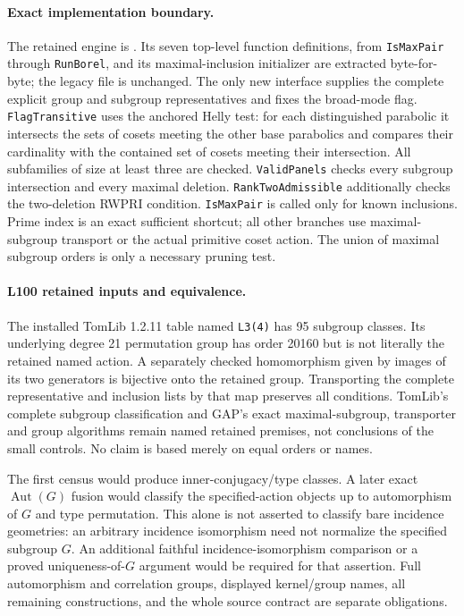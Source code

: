 \documentclass[11pt]{article}
\begin{document}
\paragraph{Exact implementation boundary.}
The retained engine is .
Its seven top-level function definitions, from \texttt{IsMaxPair} through
\texttt{RunBorel}, and its maximal-inclusion initializer are extracted
byte-for-byte; the legacy file is unchanged. The only new interface supplies the complete explicit group and
subgroup representatives and fixes the broad-mode flag. \texttt{FlagTransitive}
uses the anchored Helly test: for each distinguished parabolic it intersects
the sets of cosets meeting the other base parabolics and compares their
cardinality with the contained set of cosets meeting their intersection.
All subfamilies of size at least three are checked. \texttt{ValidPanels}
checks every subgroup intersection and every maximal deletion.
\texttt{RankTwoAdmissible} additionally checks the two-deletion RWPRI condition.
\texttt{IsMaxPair} is called only for known inclusions. Prime index is an
exact sufficient shortcut; all other branches use maximal-subgroup
transport or the actual primitive coset action. The union of maximal
subgroup orders is only a necessary pruning test.

\paragraph{L100 retained inputs and equivalence.}
The installed TomLib 1.2.11 table named \texttt{L3(4)} has 95 subgroup classes.
Its underlying degree 21 permutation group has order 20160 but is not literally
the retained named action. A separately checked homomorphism given by images
of its two generators is bijective onto the retained group. Transporting
the complete representative and inclusion lists by that map preserves all
conditions. TomLib's complete subgroup classification and GAP's exact
maximal-subgroup, transporter and group algorithms remain named retained
premises, not conclusions of the small controls. No claim is based merely
on equal orders or names.

The first census would produce inner-conjugacy/type classes. A later exact
$\operatorname{Aut}(G)$ fusion would classify the specified-action objects
up to automorphism of $G$ and type permutation. This alone is not asserted
to classify bare incidence geometries: an arbitrary incidence isomorphism
need not normalize the specified subgroup $G$. An additional faithful
incidence-isomorphism comparison or a proved uniqueness-of-$G$ argument
would be required for that assertion. Full automorphism and correlation
groups, displayed kernel/group names, all remaining constructions, and the
whole source contract are separate obligations.
\end{document}

